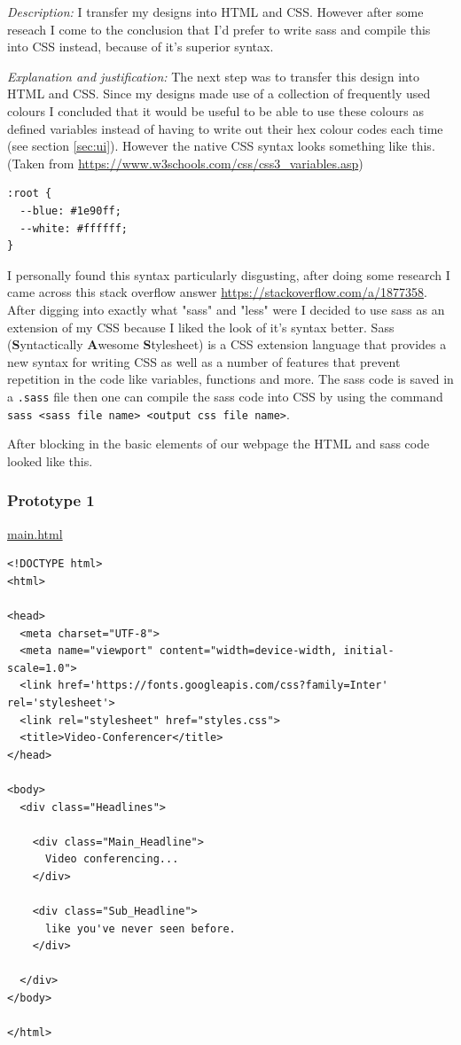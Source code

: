 \textit{Description:}
I transfer my designs into HTML and CSS. However after some
reseach I come to the conclusion that I'd prefer to write
sass and compile this into CSS instead, because of it's
superior syntax. \\ \vspace{0.2cm}

\textit{Explanation and justification:}
The next step was to transfer this design into HTML and CSS.
Since my designs made use of a collection of frequently used
colours I concluded that it would be useful to be able to use
these colours as defined variables instead of having to write
out their hex colour codes each time
(see section \ref{sec:ui}). However the native CSS syntax
looks something like this. (Taken from \url{https://www.w3schools.com/css/css3_variables.asp})

\begin{verbatim}
:root {
  --blue: #1e90ff;
  --white: #ffffff;
}
\end{verbatim}

I personally found this syntax particularly disgusting,
after doing some research I came across this stack overflow
answer \url{https://stackoverflow.com/a/1877358}. After digging
into exactly what "sass" and "less" were I decided to use sass
as an extension of my CSS because I liked the look of it's
syntax better. Sass (\textbf{S}yntactically \textbf{A}wesome
\textbf{S}tylesheet) is a CSS extension language that
provides a new syntax for writing CSS as well as a number of
features that prevent repetition in the code like variables,
functions and more. The sass code is saved in a \texttt{.sass}
file then one can compile the sass code into CSS by using the
command \texttt{sass <sass file name> <output css file name>}.
\\ \vspace{0.2cm}

After blocking in the basic elements of our webpage the HTML
and sass code looked like this.

\subsubsection{Prototype 1}

\underline{main.html}

\begin{verbatim}
<!DOCTYPE html>
<html>

<head>
  <meta charset="UTF-8">
  <meta name="viewport" content="width=device-width, initial-scale=1.0">
  <link href='https://fonts.googleapis.com/css?family=Inter' rel='stylesheet'>
  <link rel="stylesheet" href="styles.css">
  <title>Video-Conferencer</title>
</head>

<body>
  <div class="Headlines">

    <div class="Main_Headline">
      Video conferencing...
    </div>

    <div class="Sub_Headline">
      like you've never seen before.
    </div>

  </div>
</body>

</html>
\end{verbatim}


